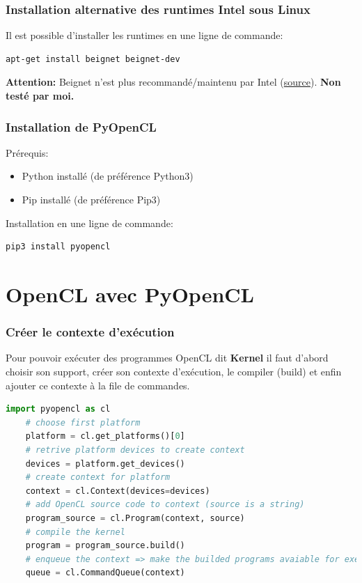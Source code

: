 \documentclass[8pt]{beamer}
\begin{document}
\begin{frame}[fragile]
    \frametitle{Installation alternative des runtimes Intel sous Linux}
    Il est possible d'installer les runtimes en une ligne de commande:
    \begin{lstlisting}[language=sh]
    apt-get install beignet beignet-dev
    \end{lstlisting}
    \vspace{20pt}
    \textbf{Attention:} Beignet n'est plus recommandé/maintenu par Intel 
    (\href{https://software.intel.com/en-us/forums/opencl/topic/758168}{source}).
    \newline
    \textbf{Non testé par moi.}
\end{frame}

\begin{frame}[fragile]
    \frametitle{Installation de PyOpenCL}
    Prérequis:
    \begin{itemize}
        \item Python installé (de préférence Python3)
        \item Pip installé (de préférence Pip3)
    \end{itemize}
    \vspace{20pt}
    Installation en une ligne de commande:
    \begin{lstlisting}[language=sh]
        pip3 install pyopencl
    \end{lstlisting}
\end{frame}

\section{OpenCL avec PyOpenCL}
\begin{frame}[fragile]
    \frametitle{Créer le contexte d'exécution}
    Pour pouvoir exécuter des programmes OpenCL dit \textbf{Kernel} 
    il faut d'abord choisir son support, créer son contexte d'exécution, 
    le compiler (build) et enfin ajouter ce contexte à la file de commandes.
    \begin{lstlisting}[language=Python]
    import pyopencl as cl
    # choose first platform 
    platform = cl.get_platforms()[0]       
    # retrive platform devices to create context
    devices = platform.get_devices()        
    # create context for platform
    context = cl.Context(devices=devices)    
    # add OpenCL source code to context (source is a string)
    program_source = cl.Program(context, source)
    # compile the kernel
    program = program_source.build()
    # enqueue the context => make the builded programs avaiable for execution
    queue = cl.CommandQueue(context)
    \end{lstlisting}
\end{frame}
\end{document}
